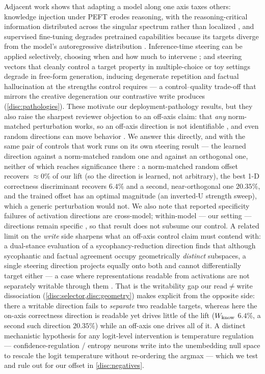 Adjacent work shows that adapting a model along one axis taxes others: knowledge
injection under PEFT erodes reasoning, with the reasoning-critical information
distributed across the singular spectrum rather than localized \citep{PALoRA}, and
supervised fine-tuning degrades pretrained capabilities because its targets diverge
from the model's autoregressive distribution \citep{MixSD}. Inference-time steering
can be applied selectively, choosing when and how much to intervene \citep{MERA}; and steering vectors that cleanly control a target property in
multiple-choice or toy settings degrade in free-form generation, inducing degenerate
repetition and factual hallucination at the strengths control requires
\citep{BeyondMultipleChoiceSteering} --- a control--quality trade-off that mirrors the
creative degeneration our contrastive write produces (\cref{disc:pathologies}).
These motivate our deployment-pathology results, but they also raise the sharpest
reviewer objection to an off-axis claim: that \emph{any} norm-matched perturbation
works, so an off-axis direction is not identifiable \citep{NonIdentifiability}, and
even random directions can move behavior \citep{RogueScalpel}. We answer this
directly, and with the same pair of controls that work runs on its own steering
result --- the learned direction against a norm-matched random one and against an
orthogonal one, neither of which reaches significance there
\citep{ConfidenceManifold}: a norm-matched random offset
recovers ${\approx}0\%$ of our lift (so the direction is learned, not arbitrary),
the best 1-D correctness discriminant recovers $6.4\%$ and a second, near-orthogonal
one $20.35\%$, and the trained offset has an
optimal magnitude (an inverted-U strength sweep), which a generic perturbation would
not. We also note that reported specificity failures of activation directions are
cross-model; within-model --- our setting --- directions remain specific
\citep{SyedActivationDirections}, so that result does not subsume our control. A
related limit on the \emph{write} side sharpens what an off-axis control claim must
contend with: a dual-stance evaluation of a sycophancy-reduction direction finds
that although sycophantic and factual agreement occupy geometrically \emph{distinct}
subspaces, a single steering direction projects equally onto both and cannot
differentially target either --- a case where representations readable from
activations are not separately writable through them \citep{DualStanceSycophancy}.
That is the writability gap our read${\neq}$write dissociation
(\cref{disc:selector,disc:geometry}) makes explicit from the opposite side: there a
writable direction fails to \emph{separate} two readable targets, whereas here the
on-axis correctness direction is readable yet drives little of the lift
($W_{\mathrm{know}}$ $6.4\%$, a second such direction $20.35\%$) while an off-axis one drives
all of it. A distinct mechanistic hypothesis for
any logit-level intervention is temperature regulation --- confidence-regulation /
entropy neurons write into the unembedding null space to rescale the logit
temperature without re-ordering the argmax \citep{ConfidenceRegulationNeurons} ---
which we test and rule out for our offset in \cref{disc:negatives}.


